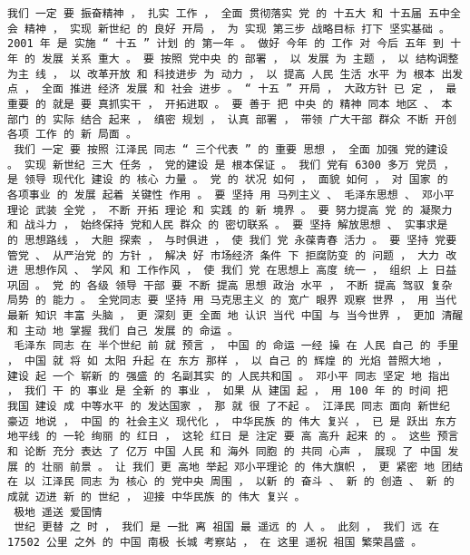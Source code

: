 \documentclass{article}
\begin{document}
\begin{Verbatim}[commandchars=\\\{\}]
 我们 一定 要 振奋精神 ， 扎实 工作 ， 全面 贯彻落实 党 的 十五大 和 十五届 五中全会 精神 ， 实现 新世纪 的 良好 开局 ， 为 实现 第三步 战略目标 打下 坚实基础 。 2001 年 是 实施 “ 十五 ” 计划 的 第一年 。 做好 今年 的 工作 对 今后 五年 到 十年 的 发展 关系 重大 。 要 按照 党中央 的 部署 ， 以 发展 为 主题 ， 以 结构调整 为主 线 ， 以 改革开放 和 科技进步 为 动力 ， 以 提高 人民 生活 水平 为 根本 出发点 ， 全面 推进 经济 发展 和 社会 进步 。 “ 十五 ” 开局 ， 大政方针 已 定 ， 最 重要 的 就是 要 真抓实干 ， 开拓进取 。 要 善于 把 中央 的 精神 同本 地区 、 本 部门 的 实际 结合 起来 ， 缜密 规划 ， 认真 部署 ， 带领 广大干部 群众 不断 开创 各项 工作 的 新 局面 。 
 我们 一定 要 按照 江泽民 同志 “ 三个代表 ” 的 重要 思想 ， 全面 加强 党的建设 。 实现 新世纪 三大 任务 ， 党的建设 是 根本保证 。 我们 党有 6300 多万 党员 ， 是 领导 现代化 建设 的 核心 力量 。 党 的 状况 如何 ， 面貌 如何 ， 对 国家 的 各项事业 的 发展 起着 关键性 作用 。 要 坚持 用 马列主义 、 毛泽东思想 、 邓小平理论 武装 全党 ， 不断 开拓 理论 和 实践 的 新 境界 。 要 努力提高 党 的 凝聚力 和 战斗力 ， 始终保持 党和人民 群众 的 密切联系 。 要 坚持 解放思想 、 实事求是 的 思想路线 ， 大胆 探索 ， 与时俱进 ， 使 我们 党 永葆青春 活力 。 要 坚持 党要 管党 、 从严治党 的 方针 ， 解决 好 市场经济 条件 下 拒腐防变 的 问题 ， 大力 改进 思想作风 、 学风 和 工作作风 ， 使 我们 党 在思想上 高度 统一 ， 组织 上 日益巩固 。 党 的 各级 领导 干部 要 不断 提高 思想 政治 水平 ， 不断 提高 驾驭 复杂 局势 的 能力 。 全党同志 要 坚持 用 马克思主义 的 宽广 眼界 观察 世界 ， 用 当代 最新 知识 丰富 头脑 ， 更 深刻 更 全面 地 认识 当代 中国 与 当今世界 ， 更加 清醒 和 主动 地 掌握 我们 自己 发展 的 命运 。 
 毛泽东 同志 在 半个世纪 前 就 预言 ， 中国 的 命运 一经 操 在 人民 自己 的 手里 ， 中国 就 将 如 太阳 升起 在 东方 那样 ， 以 自己 的 辉煌 的 光焰 普照大地 ， 建设 起 一个 崭新 的 强盛 的 名副其实 的 人民共和国 。 邓小平 同志 坚定 地 指出 ， 我们 干 的 事业 是 全新 的 事业 ， 如果 从 建国 起 ， 用 100 年 的 时间 把 我国 建设 成 中等水平 的 发达国家 ， 那 就 很 了不起 。 江泽民 同志 面向 新世纪 豪迈 地说 ， 中国 的 社会主义 现代化 ， 中华民族 的 伟大 复兴 ， 已 是 跃出 东方 地平线 的 一轮 绚丽 的 红日 ， 这轮 红日 是 注定 要 高 高升 起来 的 。 这些 预言 和 论断 充分 表达 了 亿万 中国 人民 和 海外 同胞 的 共同 心声 ， 展现 了 中国 发展 的 壮丽 前景 。 让 我们 更 高地 举起 邓小平理论 的 伟大旗帜 ， 更 紧密 地 团结 在 以 江泽民 同志 为 核心 的 党中央 周围 ， 以新 的 奋斗 、 新 的 创造 、 新 的 成就 迈进 新 的 世纪 ， 迎接 中华民族 的 伟大 复兴 。 
 极地 遥送 爱国情 
 世纪 更替 之 时 ， 我们 是 一批 离 祖国 最 遥远 的 人 。 此刻 ， 我们 远 在 17502 公里 之外 的 中国 南极 长城 考察站 ， 在 这里 遥祝 祖国 繁荣昌盛 。 

\end{Verbatim}
\end{document}

